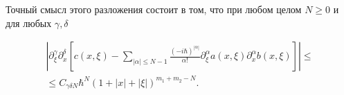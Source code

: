 \documentclass[10pt]{article}
\begin{document}
Точный смысл этого разложения состоит в том, что при любом целом $N \geqslant 0$ и для любых $\gamma, \delta$



\[

\begin{gathered}

\left|\partial_{\xi}^{\gamma} \partial_{x}^{\delta}\left[c(x, \xi)-\sum_{|\alpha| \leqslant N-1} \frac{(-i \hbar)^{|\alpha|}}{\alpha !} \partial_{\xi}^{\alpha} a(x, \xi) \partial_{x}^{\alpha} b(x, \xi)\right]\right| \leqslant \\

\leqslant C_{\gamma \delta N} \hbar^{N}(1+|x|+|\xi|)^{m_{1}+m_{2}-N} .

\end{gathered}

\]
\end{document}
